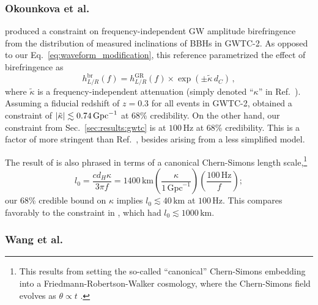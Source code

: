 \documentclass[aps,prd,twocolumn,superscriptaddress,preprintnumbers,nofootinbib]{revtex4-2}
\begin{document}
\subsubsection{Okounkova et al.}
\citet{Okounkova_2022} produced a constraint on frequency-independent \ac{GW} amplitude birefringence from the distribution of measured inclinations of \acp{BBH} in GWTC-2.
As opposed to our Eq.~\eqref{eq:waveform_modification}, this reference parametrized the effect of birefringence as
\begin{equation}
\label{eq:freqindep}
    h_{L/R}^{\mathrm{br}}(f) =
    h_{L/R}^{\mathrm{GR}}(f) \times
    \exp\left(\pm \tilde{\kappa}\, d_C\right)\,,
\end{equation}
where $\tilde{\kappa}$ is a frequency-independent attenuation (simply denoted ``$\kappa$'' in Ref.~\cite{Okounkova_2022}).
Assuming a fiducial redshift of $z=0.3$ for all events in GWTC-2, \citet{Okounkova_2022} obtained a constraint of $|\tilde{\kappa}| \lesssim 0.74\, {\rm Gpc}^{-1}$ at 68\% credibility.
On the other hand, our constraint from Sec.~\ref{sec:results:gwtc} is  at $100 \, \mathrm{Hz}$ at 68\% credibility.
This is a factor of more stringent than Ref.~\cite{Okounkova_2022}, besides arising from a less simplified model.

The result of \citet{Okounkova_2022} is also phrased in terms of a canonical Chern-Simons length scale,\footnote{This results from setting the so-called ``canonical'' Chern-Simons embedding into a Friedmann-Robertson-Walker cosmology, where the Chern-Simons field evolves as $\theta \propto t$ \cite{Alexander:2009tp,Jackiw:2003pm,Yunes2009}.}
\begin{equation}
    l_0 = \frac{c d_H \kappa}{3 \pi f} = 1400 \, \mathrm{km} \left( \frac{\kappa}{1 \, \mathrm{Gpc}^{-1}} \right) \left( \frac{100 \, \mathrm{Hz}}{f} \right);
\end{equation}
our 68\% credible bound on $\kappa$ implies $l_0 \lesssim 40 \, \mathrm{km}$ at $100 \, \mathrm{Hz}$.  This compares favorably to the constraint in \citet{Okounkova_2022}, which had $l_0 \lesssim 1000 \, \mathrm{km}$.


\subsubsection{Wang et al.}
\label{sec:comparison_Wang}
\end{document}
